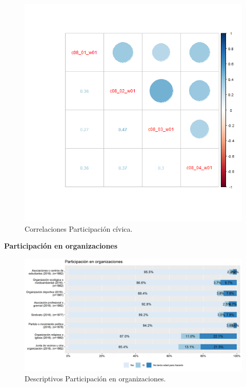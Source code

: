 \documentclass[
  12pt,
]{book}
\begin{document}
\begin{figure}[H]

{\centering \includegraphics[width=1\linewidth,height=1\textheight]{output/graphs/participacion-civica_cor} 

}

\caption{Correlaciones Participación cívica.}\label{fig:participacion-civica-cor}
\end{figure}

\textbf{Participación en organizaciones}

\begin{figure}[H]

{\centering \includegraphics[width=1\linewidth,height=1\textheight]{output/graphs/participacion-organizaciones} 

}

\caption{Descriptivos Participación en organizaciones.}\label{fig:participacion-organizaciones}
\end{figure}
\end{document}
